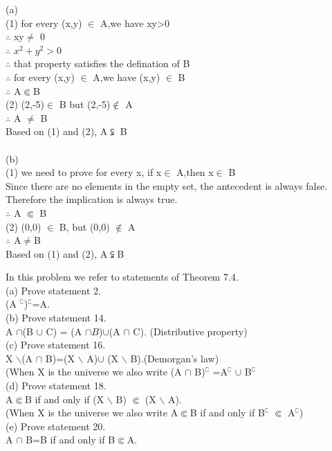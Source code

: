 \documentclass[11pt, a4paper, UTF8]{ctexart}
\begin{document}
\begin{solution}
(a)\\
(1) for every (x,y) $\in$ A,we have xy>0\\
$\therefore$ xy$\not=$ 0\\
$\therefore$ $x^2 + y^2>0$\\
$\therefore$ that property satisfies the defination of B\\
$\therefore$ for every (x,y) $\in$ A,we have (x,y) $\in$ B\\
$\therefore$ A$\Subset$B\\
(2) (2,-5)$\in$ B but (2,-5)$\notin$ A\\
$\therefore$ A $\not=$ B\\
Based on (1) and (2), A$\subsetneqq$ B\\
\\
(b)\\
(1) we need to prove for every x, if x$\in$ A,then x$\in$ B\\
Since there are no elements in the empty set, the antecedent is always false. Therefore the implication is always true.\\
$\therefore$ A $\Subset$ B\\
(2) (0,0) $\in$ B, but (0,0) $\notin$ A\\
$\therefore$ A$\not=$B\\
Based on (1) and (2), A$\subsetneqq$B\\
\end{solution}

\begin{problem}[UD:7.1]
In this problem we refer to statements of Theorem 7.4.\\
(a) Prove statement 2. \\
(A $^\complement$)$^\complement$=A.\\
(b) Prove statement 14. \\
A $\cap$(B $\cup$ C) = (A $\cap B$)$\cup$(A $\cap$ C). (Distributive property)\\
(c) Prove statement 16. \\
X $\backslash$(A $\cap$ B)=(X $\backslash$ A)$\cup$ (X $\backslash$ B).(Demorgan's law)\\
\indent (When X is the universe we also write (A $\cap$ B)$^\complement$ =A$^\complement$ $\cup$ B$^\complement$\\
(d) Prove statement 18.\\
A$\Subset$B if and only if (X $\backslash$ B) $\Subset$ (X $\backslash$ A).\\
\indent (When X is the universe we also write A$\Subset$B if and only if B$^\complement$ $\Subset$ A$^\complement$)\\
(e) Prove statement 20.\\
A $\cap$ B=B if and only if B$\Subset$A.
\end{problem}
\end{document}
